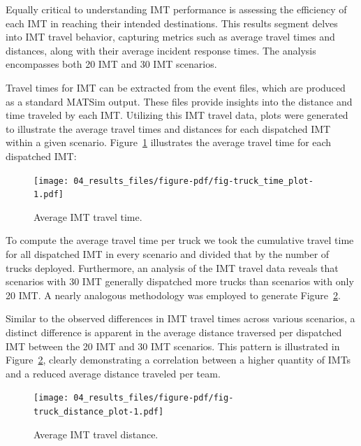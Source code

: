 \documentclass[fancy, oneside, mastersfancy, ms]{byuthesis}
\begin{document}
Equally critical to understanding IMT performance is assessing the
efficiency of each IMT in reaching their intended destinations. This
results segment delves into IMT travel behavior, capturing metrics such
as average travel times and distances, along with their average incident
response times. The analysis encompasses both 20 IMT and 30 IMT
scenarios.

Travel times for IMT can be extracted from the event files, which are
produced as a standard MATSim output. These files provide insights into
the distance and time traveled by each IMT. Utilizing this IMT travel
data, plots were generated to illustrate the average travel times and
distances for each dispatched IMT within a given scenario.
Figure~\ref{fig-truck_time_plot} illustrates the average travel time for
each dispatched IMT:

\begin{figure}

{\centering \texttt{[image: 04\_results\_files/figure-pdf/fig-truck\_time\_plot-1.pdf]}

}

\caption{\label{fig-truck_time_plot}Average IMT travel time.}

\end{figure}

To compute the average travel time per truck we took the cumulative
travel time for all dispatched IMT in every scenario and divided that by
the number of trucks deployed. Furthermore, an analysis of the IMT
travel data reveals that scenarios with 30 IMT generally dispatched more
trucks than scenarios with only 20 IMT. A nearly analogous methodology
was employed to generate Figure~\ref{fig-truck_distance_plot}.

Similar to the observed differences in IMT travel times across various
scenarios, a distinct difference is apparent in the average distance
traversed per dispatched IMT between the 20 IMT and 30 IMT scenarios.
This pattern is illustrated in Figure~\ref{fig-truck_distance_plot},
clearly demonstrating a correlation between a higher quantity of IMTs
and a reduced average distance traveled per team.

\begin{figure}

{\centering \texttt{[image: 04\_results\_files/figure-pdf/fig-truck\_distance\_plot-1.pdf]}

}

\caption{\label{fig-truck_distance_plot}Average IMT travel distance.}

\end{figure}
\end{document}
